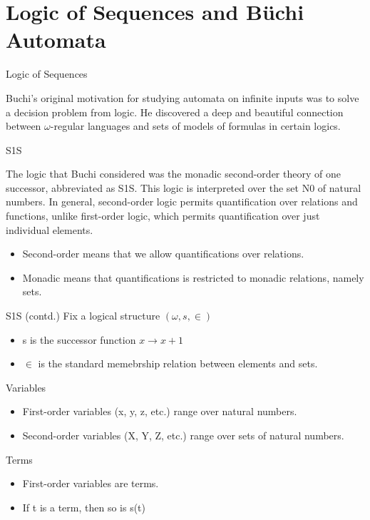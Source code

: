 \documentclass[14pts]{beamer}
\begin{document}
    \section{Logic of Sequences and Büchi Automata}
    \begin{frame}{Logic of Sequences}

      Buchi’s original motivation for studying automata on infinite inputs was to solve a
  decision problem from logic. He discovered a deep and beautiful connection between
  $\omega$-regular languages and sets of models of formulas in certain logics.
    \end{frame}
    \begin{frame}{S1S}

      The logic that Buchi considered was the monadic second-order theory of one successor, abbreviated as S1S. This logic is interpreted over the set N0 of natural numbers.
      In general, second-order logic permits quantification over relations and functions,
      unlike first-order logic, which permits quantification over just individual elements.
      
      \begin{block}
      
        \begin{itemize}
          \item Second-order means that we allow quantifications over relations.
          \item Monadic means that quantifications is restricted to monadic relations, namely sets.
        \end{itemize}
      \end{block}
    \end{frame}
    \begin{frame}{S1S (contd.)}
      Fix a logical structure $(\omega, s, \in)$
      \begin{itemize}
        \item s is the successor function $x \rightarrow x + 1$
        \item $\in$ is the standard memebrship relation between elements and sets.
      \end{itemize}
      \begin{block}{Variables}
        \begin{itemize}
          \item First-order variables (x, y, z, etc.) range over natural numbers.
          \item Second-order variables (X, Y, Z, etc.) range over sets of natural numbers.
        \end{itemize}
      \end{block}
      \begin{block}{Terms}
        \begin{itemize}
          \item First-order variables are terms.
          \item If t is a term, then so is s(t)
        \end{itemize}
      \end{block}
    \end{frame}
\end{document}
